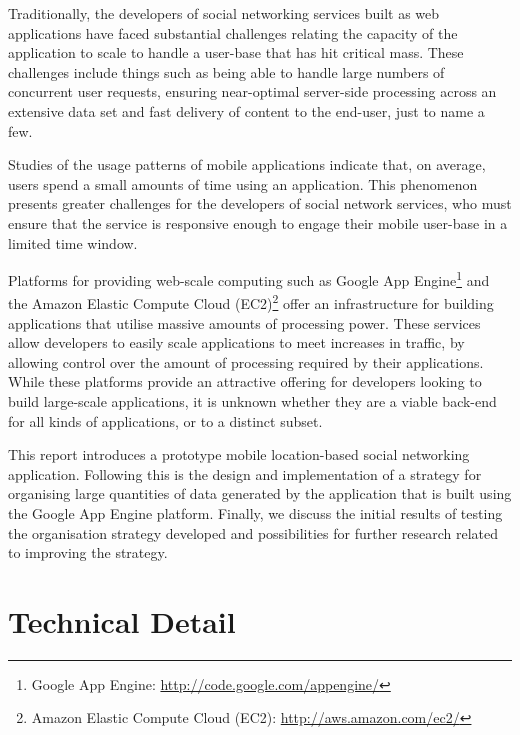 \documentclass{article}
\begin{document}
Traditionally, the developers of social networking services built as web applications have faced substantial challenges relating the capacity of the application to scale to handle a user-base that has hit critical mass. These challenges include things such as being able to handle large numbers of concurrent user requests, ensuring near-optimal server-side processing across an extensive data set and fast delivery of content to the end-user, just to name a few.

Studies of the usage patterns of mobile applications indicate that, on average, users spend a small amounts of time using an application. This phenomenon presents greater challenges for the developers of social network services, who must ensure that the service is responsive enough to engage their mobile user-base in a limited time window.

Platforms for providing web-scale computing such as Google App Engine\footnote{Google App Engine: \url{http://code.google.com/appengine/}} and the Amazon Elastic Compute Cloud (EC2)\footnote{Amazon Elastic Compute Cloud (EC2): \url{http://aws.amazon.com/ec2/}} offer an infrastructure for building applications that utilise massive amounts of processing power. These services allow developers to easily scale applications to meet increases in traffic, by allowing control over the amount of processing required by their applications. While these platforms provide an attractive offering for developers looking to build large-scale applications, it is unknown whether they are a viable back-end for all kinds of applications, or to a distinct subset.

This report introduces a prototype mobile location-based social networking application. Following this is the design and implementation of a strategy for organising large quantities of data generated by the application that is built using the Google App Engine platform. Finally, we discuss the initial results of testing the organisation strategy developed and possibilities for further research related to improving the strategy.


\section{Technical Detail} %
\label{sec:technical_detail}
\end{document}
